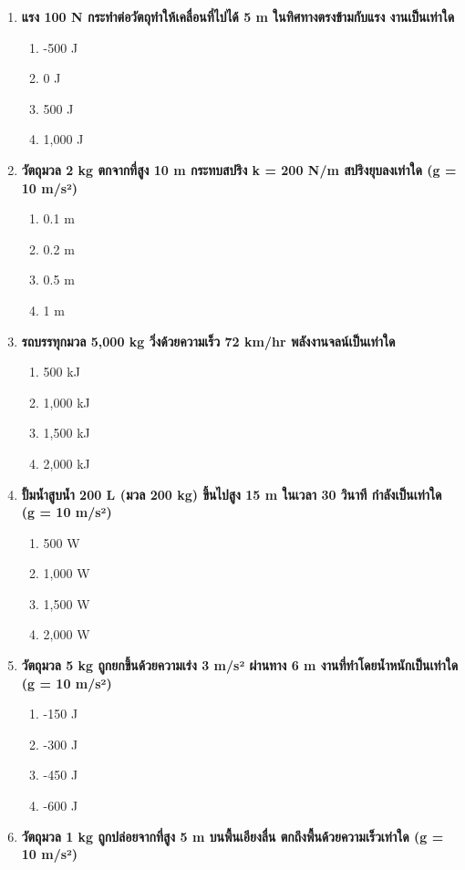 \documentclass[12pt]{article}
\begin{document}
\begin{enumerate}
\item \textbf{แรง 100 N กระทำต่อวัตถุทำให้เคลื่อนที่ไปได้ 5 m ในทิศทางตรงข้ามกับแรง งานเป็นเท่าใด}
\begin{enumerate}[label=\alph*)]
\item -500 J
\item 0 J
\item 500 J
\item 1,000 J
\end{enumerate}
\item \textbf{วัตถุมวล 2 kg ตกจากที่สูง 10 m กระทบสปริง k = 200 N/m สปริงยุบลงเท่าใด (g = 10 m/s²)}
\begin{enumerate}[label=\alph*)]
\item 0.1 m
\item 0.2 m
\item 0.5 m
\item 1 m
\end{enumerate}
\item \textbf{รถบรรทุกมวล 5,000 kg วิ่งด้วยความเร็ว 72 km/hr พลังงานจลน์เป็นเท่าใด}
\begin{enumerate}[label=\alph*)]
\item 500 kJ
\item 1,000 kJ
\item 1,500 kJ
\item 2,000 kJ
\end{enumerate}
\item \textbf{ปั้มน้ำสูบน้ำ 200 L (มวล 200 kg) ขึ้นไปสูง 15 m ในเวลา 30 วินาที กำลังเป็นเท่าใด (g = 10 m/s²)}
\begin{enumerate}[label=\alph*)]
\item 500 W
\item 1,000 W
\item 1,500 W
\item 2,000 W
\end{enumerate}
\item \textbf{วัตถุมวล 5 kg ถูกยกขึ้นด้วยความเร่ง 3 m/s² ผ่านทาง 6 m งานที่ทำโดยน้ำหนักเป็นเท่าใด (g = 10 m/s²)}
\begin{enumerate}[label=\alph*)]
\item -150 J
\item -300 J
\item -450 J
\item -600 J
\end{enumerate}
\item \textbf{วัตถุมวล 1 kg ถูกปล่อยจากที่สูง 5 m บนพื้นเอียงลื่น ตกถึงพื้นด้วยความเร็วเท่าใด (g = 10 m/s²)}
\begin{enumerate}[label=\alph*)]

\end{enumerate}
\end{enumerate}
\end{document}
